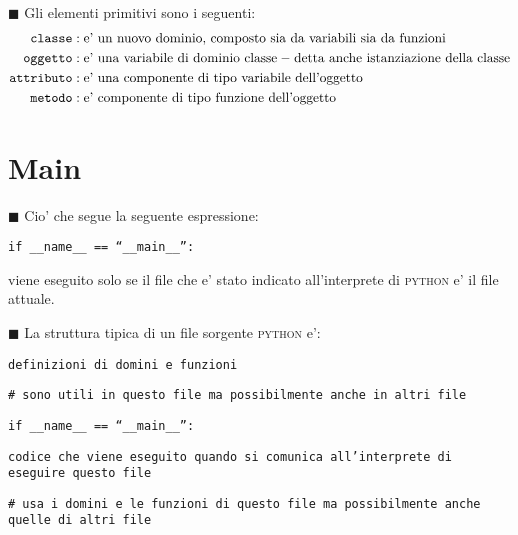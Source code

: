 \documentclass[a4paper,12pt,fleqn,leqno,twoside]{article}
\newcommand{\n}{\textnormal} %
\renewcommand{\b}{\textbf} %
\newcommand{\tw}{\texttt} %
\renewcommand{\sc}{\textsc} %
\newcommand{\bbox}{{\scriptsize $\blacksquare$}} %
\newcommand{\skipline}{\vspace{\baselineskip}} %
\newcommand{\bitem}[1]{\bbox \; #1\par \skipline}
\begin{document}
\bbox \; Gli elementi primitivi sono i seguenti:
\begin{align*}
\tw{classe}&: \n{e' un nuovo dominio, composto sia da variabili sia da funzioni}\\
\tw{oggetto}&: \n{e' una variabile di dominio classe \b{--} detta anche istanziazione della classe}\\
\tw{attributo}&: \n{e' una componente di tipo variabile dell'oggetto}\\
\tw{metodo}&: \n{e' componente di tipo funzione dell'oggetto}\\
\end{align*}

\section{Main}

\bitem{Cio' che segue la seguente espressione:}

\tw{if \_\_name\_\_ == ``\_\_main\_\_'':}

\skipline

viene eseguito solo se il file che e' stato indicato all'interprete di \sc{python} e' il file attuale.

\skipline

\bitem{La struttura tipica di un file sorgente \sc{python} e':}

\tw{definizioni di domini e funzioni}\par
\tw{\# sono utili in questo file ma possibilmente anche in altri file}

\skipline

\tw{if \_\_name\_\_ == ``\_\_main\_\_'':}

\skipline

\tw{codice che viene eseguito quando si comunica all'interprete di eseguire questo file}\par
\tw{\# usa i domini e le funzioni di questo file ma possibilmente anche quelle di altri file}
\end{document}
